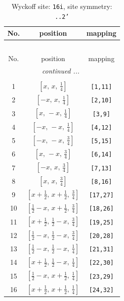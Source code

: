 \documentclass[fleqn,8pt]{jsarticle}
\begin{document}
\begin{longtable}{ccc}
\caption{Wyckoff site: {\tt 16i}, site symmetry: {\tt ..2'}}
 \\
 \hline \hline
No. & position & mapping \\ \hline \endfirsthead

\multicolumn{2}{l}{\tablename\ \thetable{}} \\
 \hline \hline
No. & position & mapping \\ \hline \endhead

 \hline \hline
\multicolumn{2}{r}{\footnotesize\it continued ...} \\ \endfoot

 \hline \hline
\multicolumn{2}{r}{} \\ \endlastfoot

1 & $\left[ x,\, x,\, \frac{1}{4} \right]$ & {\tt [1,11]} \\ \hline
2 & $\left[ - x,\, x,\, \frac{1}{4} \right]$ & {\tt [2,10]} \\ \hline
3 & $\left[ x,\, - x,\, \frac{1}{4} \right]$ & {\tt [3,9]} \\ \hline
4 & $\left[ - x,\, - x,\, \frac{1}{4} \right]$ & {\tt [4,12]} \\ \hline
5 & $\left[ - x,\, - x,\, \frac{3}{4} \right]$ & {\tt [5,15]} \\ \hline
6 & $\left[ x,\, - x,\, \frac{3}{4} \right]$ & {\tt [6,14]} \\ \hline
7 & $\left[ - x,\, x,\, \frac{3}{4} \right]$ & {\tt [7,13]} \\ \hline
8 & $\left[ x,\, x,\, \frac{3}{4} \right]$ & {\tt [8,16]} \\ \hline
9 & $\left[ x + \frac{1}{2},\, x + \frac{1}{2},\, \frac{3}{4} \right]$ & {\tt [17,27]} \\ \hline
10 & $\left[ \frac{1}{2} - x,\, x + \frac{1}{2},\, \frac{3}{4} \right]$ & {\tt [18,26]} \\ \hline
11 & $\left[ x + \frac{1}{2},\, \frac{1}{2} - x,\, \frac{3}{4} \right]$ & {\tt [19,25]} \\ \hline
12 & $\left[ \frac{1}{2} - x,\, \frac{1}{2} - x,\, \frac{3}{4} \right]$ & {\tt [20,28]} \\ \hline
13 & $\left[ \frac{1}{2} - x,\, \frac{1}{2} - x,\, \frac{1}{4} \right]$ & {\tt [21,31]} \\ \hline
14 & $\left[ x + \frac{1}{2},\, \frac{1}{2} - x,\, \frac{1}{4} \right]$ & {\tt [22,30]} \\ \hline
15 & $\left[ \frac{1}{2} - x,\, x + \frac{1}{2},\, \frac{1}{4} \right]$ & {\tt [23,29]} \\ \hline
16 & $\left[ x + \frac{1}{2},\, x + \frac{1}{2},\, \frac{1}{4} \right]$ & {\tt [24,32]} \\
\end{longtable}
\end{document}
